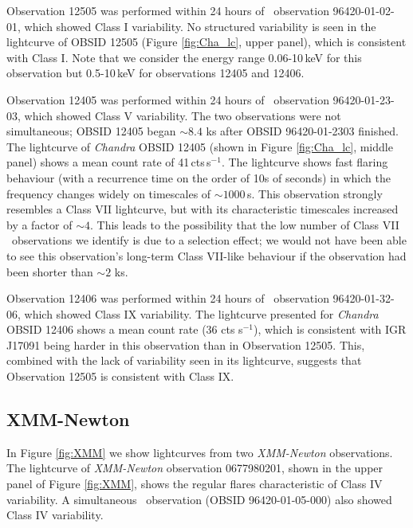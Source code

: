 \par Observation 12505 was performed within 24 hours of \rxte\ observation 96420-01-02-01, which showed Class I variability.  No structured variability is seen in the lightcurve of OBSID 12505 (Figure \ref{fig:Cha_lc}, upper panel), which is consistent with Class I.  Note that we consider the energy range 0.06-10\,keV for this observation but 0.5-10\,keV for observations 12405 and 12406.
\par Observation 12405 was performed within 24 hours of \rxte\ observation 96420-01-23-03, which showed Class V variability.  The two observations were not simultaneous; OBSID 12405 began $\sim8.4$ ks after OBSID 96420-01-2303 finished.  The lightcurve of \textit{Chandra} OBSID 12405 (shown in Figure \ref{fig:Cha_lc}, middle panel) shows a mean count rate of 41\,cts\,s$^{-1}$.  The lightcurve shows fast flaring behaviour (with a recurrence time on the order of 10s of seconds) in which the frequency changes widely on timescales of $\sim1000$\,s.  This observation strongly resembles a Class VII lightcurve, but with its characteristic timescales increased by a factor of $\sim4$.  This leads to the possibility that the low number of Class VII \rxte\ observations we identify is due to a selection effect; we would not have been able to see this observation's long-term Class VII-like behaviour if the observation had been shorter than $\sim2$ ks.
\par Observation 12406 was performed within 24 hours of \rxte\ observation 96420-01-32-06, which showed Class IX variability.  The lightcurve presented for \textit{Chandra} OBSID 12406 shows a mean count rate (36 cts s$^{-1}$), which is consistent with IGR J17091 being harder in this observation than in Observation 12505.  This, combined with the lack of variability seen in its lightcurve, suggests that Observation 12505 is consistent with Class IX.

\subsection{XMM-Newton}

\par In Figure \ref{fig:XMM} we show lightcurves from two \textit{XMM-Newton} observations.  The lightcurve of \textit{XMM-Newton} observation 0677980201, shown in the upper panel of Figure \ref{fig:XMM}, shows the regular flares characteristic of Class IV variability.  A simultaneous \rxte\ observation (OBSID 96420-01-05-000) also showed Class IV variability.

